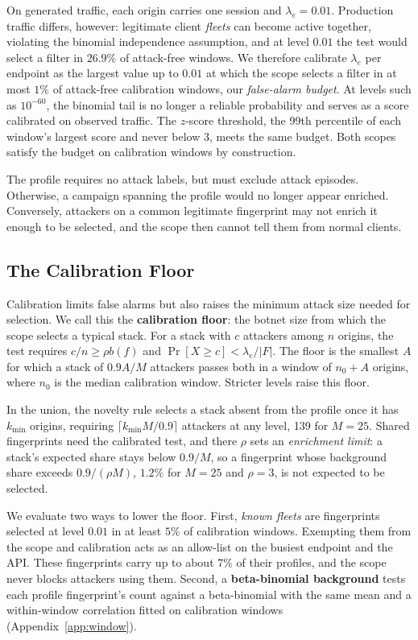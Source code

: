 \documentclass[conference,letterpaper,10pt]{IEEEtran}
\newcommand\1{\textit{(i)}}
\newcommand\2{\textit{(ii)}}
\newcommand\3{\textit{(iii)}}
\newcommand\4{\textit{(iv)}}
\newcommand\5{\textit{(v)}}
\newcommand\6{\textit{(vi)}}
\newcommand\7{\textit{(vii)}}
\newcommand\8{\textit{(viii)}}
\newcommand\9{\textit{(ix)}}
\begin{document}
On generated traffic, each origin carries one session
and $\lambda_e=0.01$. Production traffic differs, however: legitimate client \textit{fleets} can become active together, violating the binomial independence assumption, and at level $0.01$ the test would select a filter in $26.9\%$ of attack-free windows.
We therefore calibrate $\lambda_e$ per endpoint as the
largest value up to $0.01$ at which the scope selects a
filter in at most $1\%$ of attack-free
calibration windows, our \textit{false-alarm budget}.
At levels such as $10^{-60}$, the binomial tail is no longer
a reliable probability and serves as a score calibrated on
observed traffic.
The $z$-score threshold, the 99th percentile of each
window's largest score and never below 3, meets the same
budget. Both scopes satisfy
the budget on calibration windows by construction.


The profile requires no attack labels, but must exclude
attack episodes. Otherwise, a campaign spanning the
profile would no longer appear enriched. Conversely, attackers on a common legitimate fingerprint may not enrich it enough to be selected, and the scope then cannot tell them from normal clients.

\subsection{The Calibration Floor}
\label{sec:floor}

Calibration limits false alarms but also raises the minimum
attack size needed for selection. We call this the
\textbf{calibration floor}: the botnet size from which the
scope selects a typical stack.
For a stack with $c$ attackers among $n$ origins, the test
requires $c/n\geq\rho b(f)$ and
$\Pr[X\geq c]<\lambda_e/|F|$.
The floor is the smallest $A$ for which a stack of $0.9A/M$
attackers passes both in a window of $n_0+A$ origins, where
$n_0$ is the
median calibration window. Stricter levels raise
this floor.

In the union, the novelty rule selects a stack absent from the
profile once it has $k_{\min}$ origins, requiring $\lceil
k_{\min}M/0.9\rceil$ attackers at any level, 139 for $M=25$.
Shared fingerprints need the calibrated test, and there
$\rho$ sets an \textit{enrichment limit}: a stack's expected
share stays below $0.9/M$, so a fingerprint whose background
share exceeds $0.9/(\rho M)$, $1.2\%$ for $M=25$ and
$\rho=3$, is not expected to be selected.

We evaluate two ways to lower the floor.
First, \textit{known fleets} are fingerprints selected
at level $0.01$ in at least $5\%$ of calibration
windows. Exempting them from the scope and calibration acts as an allow-list on the busiest
endpoint and the API. These fingerprints carry up to about $7\%$ of their profiles, and the scope never blocks
attackers using them. Second, a \textbf{beta-binomial background} tests each profile fingerprint's count against a beta-binomial with the same mean and a within-window correlation fitted on calibration windows (Appendix~\ref{app:window}).
\end{document}
